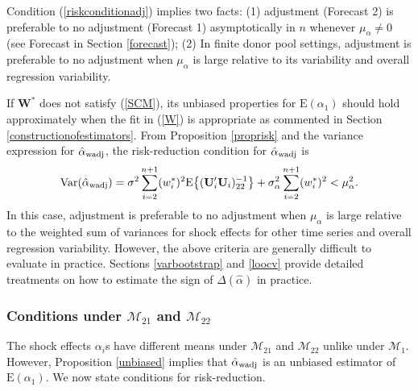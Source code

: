 \documentclass[11pt]{article}
\def\mbf#1{\mathbf{#1}} %
\def\mrm#1{\mathrm{#1}} %
\def\mc#1{\mathcal{#1}} %
\def\E#1{\mathrm{E}(#1)} %
\def\var#1{\mathrm{Var}(#1)} %
\theoremstyle{definition}
\begin{document}
Condition (\ref{riskconditionadj}) implies two facts: (1) adjustment (Forecast 2) is preferable to no adjustment (Forecast 1) asymptotically in $n$ whenever $\mu_{\alpha} \neq 0$ (see Forecast in Section \ref{forecast}); (2) In finite donor pool settings, adjustment is preferable to no adjustment when $\mu_{\alpha}$ is large relative to its variability and overall regression variability.   %

If  $\mathbf{W}^*$ does not satisfy (\ref{SCM}), its unbiased properties for $\E{\alpha_1}$ should hold approximately when the fit in (\ref{W}) is appropriate as commented in Section \ref{constructionofestimators}. From Proposition \ref{proprisk} and the variance expression for $\hat{\alpha}_{\rm wadj}$, the risk-reduction condition for $\hat{\alpha}_{\rm wadj}$ is
\begin{equation} \label{varwadj}
\var{\hat{\alpha}_{\rm wadj}}
 = \sigma^2\sum_{i=2}^{n+1}(w_i^*)^2\mrm{E}\big\{(\mbf{U}'_i\mbf{U}_i)^{-1}_{22}\big\}+\sigma^2_{\alpha}\sum_{i=2}^{n+1}(w_i^*)^2 < \mu_{\alpha}^2.
\end{equation}
In this case, adjustment is preferable to no adjustment when $\mu_{\alpha}$ is large relative to the weighted sum of variances for shock effects for other time series and overall regression variability.  However, the above criteria are generally difficult to evaluate in practice.  Sections \ref{varbootstrap} and \ref{loocv}  provide detailed treatments on how to estimate the sign of $\Delta(\hat\alpha)$ in practice.





\subsubsection{Conditions under $\mc{M}_{21}$ and $\mc{M}_{22}$}
\label{conditionsm2122}

The shock effects $\alpha_i$s have different means under $\mc{M}_{21}$ and $\mc{M}_{22}$ unlike under $\mc{M}_1$. %
However, Proposition \ref{unbiased} implies that $\hat{\alpha}_{\rm wadj}$ is an unbiased estimator of $\E{\alpha_1}$. %
We now state conditions for risk-reduction.
\end{document}
